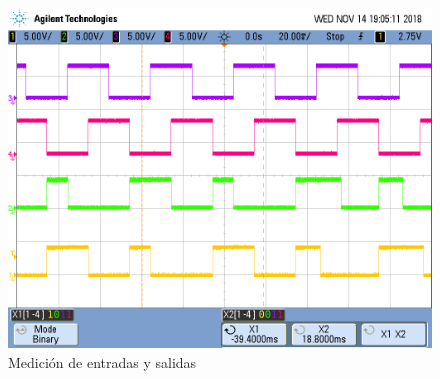 \begin{figure}[H]
\centering
\includegraphics[scale=0.3]{images/medicion_ej1_mealy}
\caption{Medición de entradas y salidas}
\label{1_fig_medicion_mealy}
\end{figure}